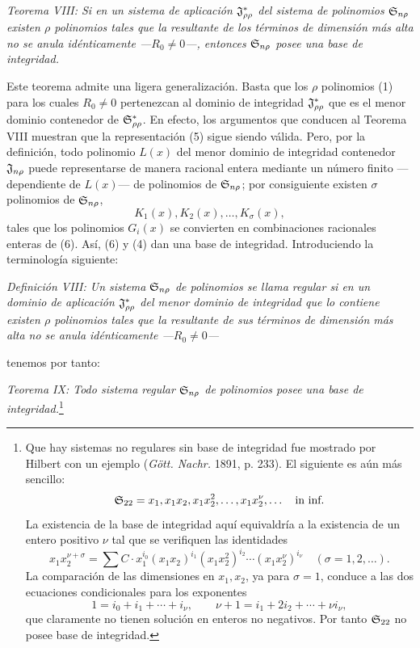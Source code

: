 \documentclass[11pt]{article}
\begin{document}
\emph{Teorema VIII: Si en un sistema de aplicación $\mathfrak{J}^*_{\rho\rho}$ del sistema de polinomios $\mathfrak{S}_{n\rho}$ existen $\rho$ polinomios tales que la resultante de los términos de dimensión más alta no se anula idénticamente ---$R_0\ne0$---, entonces $\mathfrak{S}_{n\rho}$ posee una base de integridad.}

Este teorema admite una ligera generalización. Basta que los $\rho$ polinomios (1) para los cuales $R_0\ne0$ pertenezcan al dominio de integridad $\mathfrak{J}^*_{\rho\rho}$ que es el menor dominio contenedor de $\mathfrak{S}^*_{\rho\rho}$. En efecto, los argumentos que conducen al Teorema VIII muestran que la representación (5) sigue siendo válida. Pero, por la definición, todo polinomio $L(x)$ del menor dominio de integridad contenedor $\mathfrak{J}_{n\rho}$ puede representarse de manera racional entera mediante un número finito ---dependiente de $L(x)$--- de polinomios de $\mathfrak{S}_{n\rho}$; por consiguiente existen $\sigma$ polinomios de $\mathfrak{S}_{n\rho}$,
\begin{equation}
  K_1(x),K_2(x),\ldots,K_\sigma(x),
\tag{6}
\end{equation}
tales que los polinomios $G_i(x)$ se convierten en combinaciones racionales enteras de (6). Así, (6) y (4) dan una base de integridad. Introduciendo la terminología siguiente:

\emph{Definición VIII: Un sistema $\mathfrak{S}_{n\rho}$ de polinomios se llama regular si en un dominio de aplicación $\mathfrak{J}^*_{\rho\rho}$ del menor dominio de integridad que lo contiene existen $\rho$ polinomios tales que la resultante de sus términos de dimensión más alta no se anula idénticamente ---$R_0\ne0$---}

tenemos por tanto:

\emph{Teorema IX: Todo sistema regular $\mathfrak{S}_{n\rho}$ de polinomios posee una base de integridad.}\footnote{Que hay sistemas no regulares sin base de integridad fue mostrado por Hilbert con un ejemplo (\emph{Gött. Nachr.} 1891, p. 233). El siguiente es aún más sencillo:
\[
  \mathfrak{S}_{22}=x_1,
  x_1x_2,
  x_1x_2^2,
  \ldots,
  x_1x_2^\nu,
  \ldots\quad\text{in inf.}
\]
La existencia de la base de integridad aquí equivaldría a la existencia de un entero positivo $\nu$ tal que se verifiquen las identidades
\[
  x_1x_2^{\nu+\sigma}=\sum C\cdot x_1^{i_0}(x_1x_2)^{i_1}(x_1x_2^2)^{i_2}\cdots(x_1x_2^\nu)^{i_\nu}
  \quad(\sigma=1,2,\ldots).
\]
La comparación de las dimensiones en $x_1,x_2$, ya para $\sigma=1$, conduce a las dos ecuaciones condicionales para los exponentes
\[
  1=i_0+i_1+\cdots+i_\nu,
  \qquad
  \nu+1=i_1+2i_2+\cdots+\nu i_\nu,
\]
que claramente no tienen solución en enteros no negativos. Por tanto $\mathfrak{S}_{22}$ no posee base de integridad.}
\end{document}
